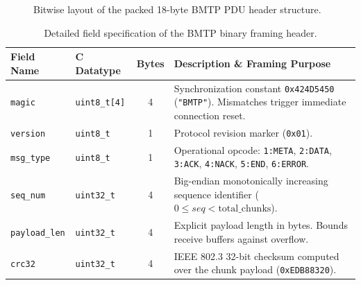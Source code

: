 \documentclass[11pt,a4paper]{article}
\begin{document}
\begin{figure}[htbp]
\caption{Bitwise layout of the packed 18-byte BMTP PDU header structure.}
\label{fig:header}
\end{figure}

\begin{table}[htbp]
\centering
\small
\begin{tabular}{@{}llcp{7.8cm}@{}}
\toprule
\textbf{Field Name} & \textbf{C Datatype} & \textbf{Bytes} & \textbf{Description \& Framing Purpose} \\
\midrule
\texttt{magic} & \texttt{uint8\_t[4]} & 4 & Synchronization constant \texttt{0x424D5450} (\texttt{"BMTP"}). Mismatches trigger immediate connection reset. \\
\texttt{version} & \texttt{uint8\_t} & 1 & Protocol revision marker (\texttt{0x01}). \\
\texttt{msg\_type} & \texttt{uint8\_t} & 1 & Operational opcode: \texttt{1:META}, \texttt{2:DATA}, \texttt{3:ACK}, \texttt{4:NACK}, \texttt{5:END}, \texttt{6:ERROR}. \\
\texttt{seq\_num} & \texttt{uint32\_t} & 4 & Big-endian monotonically increasing sequence identifier ($0 \le seq < \text{total\_chunks}$). \\
\texttt{payload\_len} & \texttt{uint32\_t} & 4 & Explicit payload length in bytes. Bounds receive buffers against overflow. \\
\texttt{crc32} & \texttt{uint32\_t} & 4 & IEEE 802.3 32-bit checksum computed over the chunk payload (\texttt{0xEDB88320}). \\
\bottomrule
\end{tabular}
\caption{Detailed field specification of the BMTP binary framing header.}
\label{tab:header_fields}
\end{table}
\end{document}
